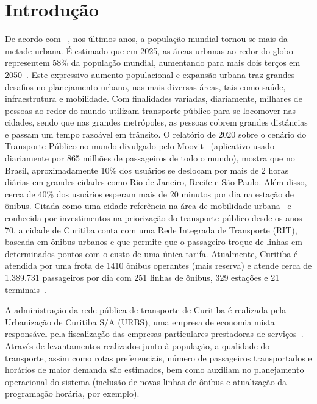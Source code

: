 


\chapter{Introdução}\label{cap:introducao}

De acordo com ~\cite{Dem:20}, nos últimos anos, a população mundial tornou-se mais da metade urbana. É estimado que em 2025, as áreas urbanas ao redor do globo representem 58\% da população mundial, aumentando para mais dois terços em 2050~\cite{new:20}. 
Este expressivo aumento populacional e expansão urbana traz grandes desafios no planejamento urbano, nas mais diversas áreas, tais como saúde, infraestrutura e mobilidade. 
Com finalidades variadas, diariamente, milhares de pessoas ao redor do mundo utilizam transporte público para se locomover nas cidades, sendo que nas grandes metrópoles, as pessoas cobrem grandes distâncias e passam um tempo razoável em trânsito.
O relatório de 2020 sobre o cenário do Transporte Público no mundo divulgado pelo Moovit~\cite{Mov:20} (aplicativo usado diariamente por 865 milhões de passageiros de todo o mundo), mostra que no Brasil, aproximadamente 10\% dos usuários se deslocam por mais de 2 horas diárias em grandes cidades como Rio de Janeiro, Recife e São Paulo. Além disso, cerca de 40\% dos usuários esperam mais de 20 minutos por dia na estação de ônibus.
Citada como uma cidade referência na área de mobilidade urbana~\cite{CWBconhecida} e conhecida por investimentos na priorização do transporte público desde os anos 70, a cidade de Curitiba conta com uma Rede Integrada de Transporte (RIT), baseada em ônibus urbanos e que permite que o passageiro troque de linhas em determinados pontos com o custo de uma única tarifa. Atualmente, Curitiba é atendida por uma frota de 1410 ônibus operantes (mais reserva) e atende cerca de 1.389.731 passageiros por dia com 251 linhas de ônibus, 329 estações e 21 terminais~\cite{Cur:19}. 

A administração da rede pública de transporte de Curitiba é realizada pela Urbanização de Curitiba S/A (URBS), uma empresa de economia mista responsável pela fiscalização das empresas particulares prestadoras de serviços~\cite{URBS}. Através de levantamentos realizados junto à população, a qualidade do transporte, assim como rotas preferenciais, número de passageiros transportados e horários de maior demanda são estimados, bem como auxiliam no planejamento operacional do sistema (inclusão de novas linhas de ônibus e atualização da programação horária, por exemplo).

